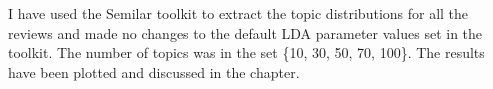 I have used the Semilar toolkit to extract the topic distributions for all the reviews and made no changes to the default LDA parameter values set in the toolkit. The number of topics was in the set \{10, 30, 50, 70, 100\}.
The results have been plotted and discussed in the  chapter.